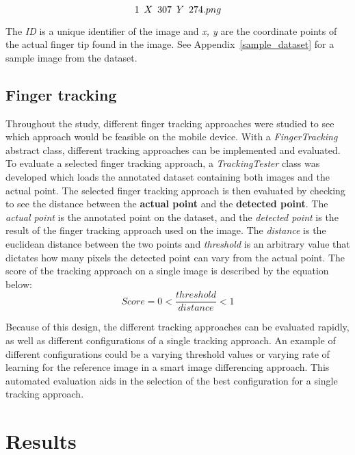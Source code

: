 \documentclass{acm_proc_article-sp}
\begin{document}
\[
1 \enskip X \enskip 307 \enskip Y \enskip 274 .png
\]


The \textit{ID} is a unique identifier of the image and \textit{x, y} are the coordinate points of the actual finger tip found in the image. See Appendix~\ref{sample_dataset} for a sample image from the dataset.

\subsection{Finger tracking}
\label{finger_tracking_evaluation}

Throughout the study, different finger tracking approaches were studied to see which approach would be feasible on the mobile device. With a \textit{FingerTracking} abstract class, different tracking approaches can be implemented and evaluated. To evaluate a selected finger tracking approach, a \textit{TrackingTester} class was developed which loads the annotated dataset containing both images and the actual point. The selected finger tracking approach is then evaluated by checking to see the distance between the \textbf{actual point} and the \textbf{detected point}. The \textit{actual point} is the annotated point on the dataset, and the \textit{detected point} is the result of the finger tracking approach used on the image. The \textit{distance} is the euclidean distance between the two points and \textit{threshold} is an arbitrary value that dictates how many pixels the detected point can vary from the actual point. The score of the tracking approach on a single image is described by the equation below:
\begin{equation}
Score = 0 < \frac{threshold}{distance} < 1
\end{equation}

Because of this design, the different tracking approaches can be evaluated rapidly, as well as different configurations of a single tracking approach. An example of different configurations could be a varying threshold values or varying rate of learning for the reference image in a smart image differencing approach. This automated evaluation aids in the selection of the best configuration for a single tracking approach.

\section{Results}
\end{document}
